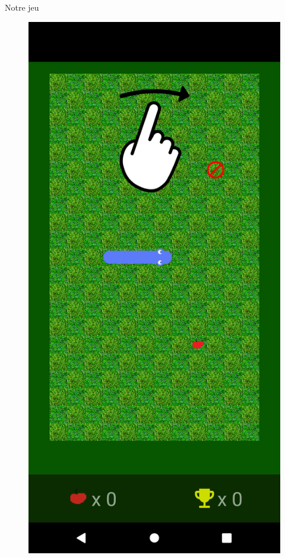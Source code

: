 \documentclass{beamer}
\begin{document}
\begin{frame}{Notre jeu}
\begin{figure}[H]
\begin{minipage}[H]{0.25\linewidth}
    \end{minipage}\hfill
    \begin{minipage}[H]{0.25\linewidth}
        \centering
        \includegraphics[scale=0.05]{Jeu.png}
    \end{minipage}\hfill

\end{figure}
\end{frame}
\end{document}
